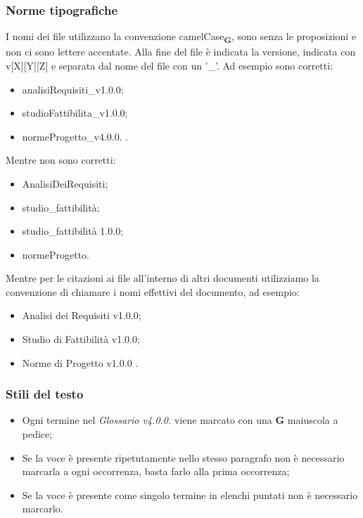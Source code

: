 \subsubsection{Norme tipografiche}
I nomi dei file utilizzano la convenzione camelCase\textsubscript{\textbf{G}}, sono senza le proposizioni e non ci sono lettere accentate.
Alla fine del file è indicata la versione, indicata con v[X][Y][Z] e separata dal nome del file con un '\_'.
Ad esempio sono corretti:
\begin{itemize}
    \item analisiRequisiti\_v1.0.0;
    \item studioFattibilita\_v1.0.0;
    \item normeProgetto\_v4.0.0. .
\end{itemize}
Mentre non sono corretti:
\begin{itemize}
    \item AnalisiDeiRequisiti;
    \item studio\_fattibilità;
    \item studio\_fattibilità 1.0.0;
    \item normeProgetto.
\end{itemize}

Mentre per le citazioni ai file all'interno di altri documenti utilizziamo la convenzione di chiamare i nomi effettivi del documento, ad esempio:
\begin{itemize}
    \item Analisi dei Requisiti v1.0.0;
    \item Studio di Fattibilità v1.0.0;
    \item Norme di Progetto v1.0.0 .
\end{itemize}

\subsubsection{Stili del testo}

\begin{itemize}
    \item Ogni termine nel \textit{Glossario v4.0.0.} viene marcato con una \textbf{G} maiuscola a pedice;
    \item Se la voce è presente ripetutamente nello stesso paragrafo non è necessario marcarla a ogni occorrenza, basta farlo alla prima occorrenza;
    \item Se la voce è presente come singolo termine in elenchi puntati non è necessario marcarlo.
\end{itemize}

